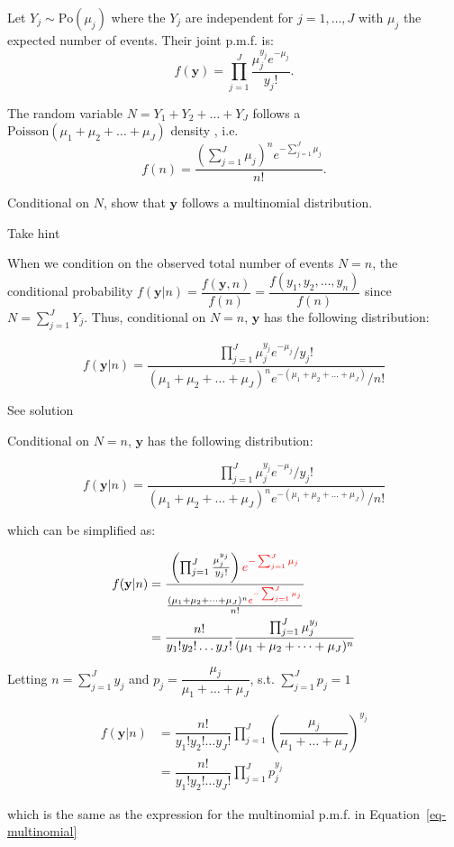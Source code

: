 \documentclass[
  letterpaper,
  DIV=11,
  numbers=noendperiod]{scrartcl}
\begin{document}
\begin{tcolorbox}[enhanced jigsaw, leftrule=.75mm, arc=.35mm, colback=white, opacityback=0, breakable, title={Task}, toprule=.15mm, opacitybacktitle=0.6, titlerule=0mm, rightrule=.15mm, bottomtitle=1mm, coltitle=black, toptitle=1mm, colframe=quarto-callout-warning-color-frame, bottomrule=.15mm, colbacktitle=quarto-callout-warning-color!10!white, left=2mm]

Let \(Y_j \sim \text{Po}(\mu_j)\) where the \(Y_j\) are independent for
\(j=1,\dots,J\) with \(\mu_j\) the expected number of events. Their
joint p.m.f. is:
\[ f(\mathbf{y})=\prod_{j=1}^J \frac{\mu_j^{y_j}e^{-\mu_j}}{y_j!}.\]

The random variable \(N=Y_1+Y_2+\dots+Y_J\) follows a
\(\mathrm{Poisson}(\mu_1+\mu_2+\dots+\mu_J)\) density ,
i.e.~\[f(n) = \dfrac{\left(\sum_{j=1}^J\mu_j\right)^ne^{-\sum_{j=1}^J\mu_j}}{n!}.\]

Conditional on \(N\), show that \(\mathbf{y}\) follows a multinomial
distribution.

Take hint

When we condition on the observed total number of events \(N=n\), the
conditional probability
\(f(\mathbf{y}|n) = \dfrac{f(\mathbf{y},n)}{f(n)} = \dfrac{f(y_1,y_2,\ldots,y_n)}{f(n)}\)
since \(N = \sum_{j=1}^J Y_j\). Thus, conditional on \(N=n\),
\(\mathbf{y}\) has the following distribution:

\[
f(\mathbf{y} |n ) =\frac{\prod_{j=1}^J \mu_j^{y_j}e^{-\mu_j}/y_j!}{(\mu_1+\mu_2+\dots+\mu_J)^ne^{-(\mu_1+\mu_2+\dots+\mu_J)}/n!}
\]

See solution

Conditional on \(N=n\), \(\mathbf{y}\) has the following distribution:

\[
f(\mathbf{y} |n ) =\frac{\prod_{j=1}^J \mu_j^{y_j}e^{-\mu_j}/y_j!}{(\mu_1+\mu_2+\dots+\mu_J)^ne^{-(\mu_1+\mu_2+\dots+\mu_J)}/n!}
\]

which can be simplified as:

\[
\begin{aligned}
f(\mathbf{y} |n ) &=\dfrac{\left(\prod_{j=1}^J \frac{\mu_j^{y_j}}{y_j!}\right)\color{red}{e^{-\sum_{j=1}^J \mu_j}}}{ \frac{(\mu_1+\mu_2+\dots+\mu_J)^n\color{red}{e^{-\sum_{j=1}^J \mu_j}}}{n!}} \\&= \dfrac{n!}{y_1!y_2!\ldots y_J!}\dfrac{\prod_{j=1}^J\mu_j^{y_j}}{(\mu_1+\mu_2+\dots+\mu_J)^n}
\end{aligned}
\]

Letting \(n= \sum_{j=1}^J y_j\) and
\(p_j = \dfrac{\mu_j}{\mu_1+\ldots+\mu_J}\), s.t. \(\sum_{j=1}^J p_j=1\)

\[
\begin{aligned}
 f(\mathbf{y}|n)&= \dfrac{n!}{y_1!y_2!\ldots y_J!} \prod_{j=1}^J\left(\dfrac{\mu_j}{\mu_1+\ldots+\mu_J}\right)^{y_j} \\&= \dfrac{n!}{y_1!y_2!\ldots y_J!} \prod_{j=1}^Jp _j^{y_j}
\end{aligned}
\]

which is the same as the expression for the multinomial p.m.f. in
Equation~\ref{eq-multinomial}

\end{tcolorbox}
\end{document}

